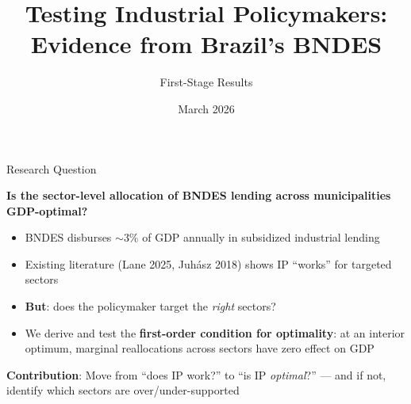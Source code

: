 \documentclass[aspectratio=169,11pt]{beamer}
\title{Testing Industrial Policymakers:\\Evidence from Brazil's BNDES}
\subtitle{First-Stage Results}
\author{}
\date{March 2026}
\begin{document}
\begin{frame}
\titlepage
\end{frame}

\begin{frame}{Research Question}

\textbf{Is the sector-level allocation of BNDES lending across municipalities GDP-optimal?}

\bigskip

\begin{itemize}
    \item BNDES disburses $\sim$3\% of GDP annually in subsidized industrial lending
    \item Existing literature (Lane 2025, Juh\'asz 2018) shows IP ``works'' for targeted sectors
    \item \textbf{But}: does the policymaker target the \emph{right} sectors?
    \item We derive and test the \textbf{first-order condition for optimality}: at an interior optimum, marginal reallocations across sectors have zero effect on GDP
\end{itemize}

\bigskip

\textbf{Contribution}: Move from ``does IP work?'' to ``is IP \emph{optimal}?''
--- and if not, identify which sectors are over/under-supported

\end{frame}
\end{document}
